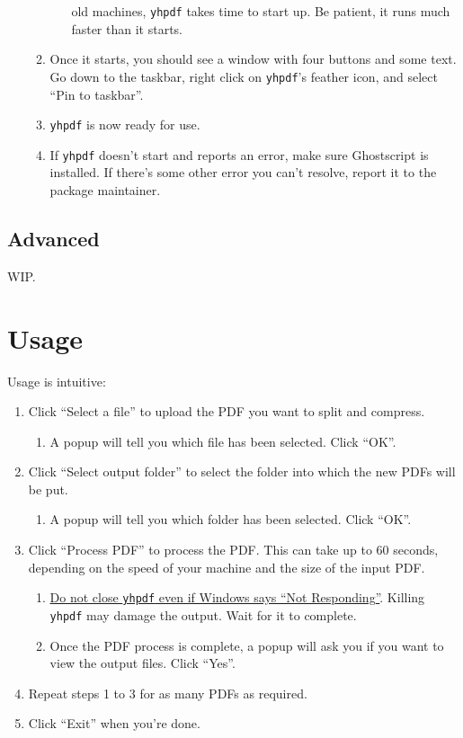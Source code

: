 \documentclass[9pt]{report}
\begin{document}
\begin{enumerate}
\begin{enumerate}
\begin{enumerate}
old machines, \texttt{yhpdf} takes time to start up. Be patient, it
runs much faster than it starts.
\end{enumerate}
\item Once it starts, you should see a window with four buttons and
some text. Go down to the taskbar, right click on \texttt{yhpdf}'s
feather icon, and select ``Pin to taskbar''.
\item \texttt{yhpdf} is now ready for use.
\item If \texttt{yhpdf} doesn't start and reports an error, make sure
Ghostscript is installed. If there's some other error you
can't resolve, report it to the package maintainer.
\end{enumerate}
\end{enumerate}

\section{Advanced}
\label{sec:orgc2d988b}
WIP.

\chapter{Usage}
\label{sec:org5d7d2d3}

Usage is intuitive:

\begin{enumerate}
\item Click ``Select a file'' to upload the PDF you want to split and
compress.
\begin{enumerate}
\item A popup will tell you which file has been selected.
Click ``OK''.
\end{enumerate}
\item Click ``Select output folder'' to select the folder into which the
new PDFs will be put.
\begin{enumerate}
\item A popup will tell you which folder has been selected. Click
``OK''.
\end{enumerate}
\item Click ``Process PDF'' to process the PDF. This can take up to 60
seconds, depending on the speed of your machine and the size of
the input PDF.
\begin{enumerate}
\item \uline{Do not close \texttt{yhpdf} even if Windows says ``Not Responding''}.
Killing \texttt{yhpdf} may damage the output. Wait for it to
complete.
\item Once the PDF process is complete, a popup will ask you if you
want to view the output files. Click ``Yes''.
\end{enumerate}
\item Repeat steps 1 to 3 for as many PDFs as required.
\item Click ``Exit'' when you're done.
\end{enumerate}
\end{document}
